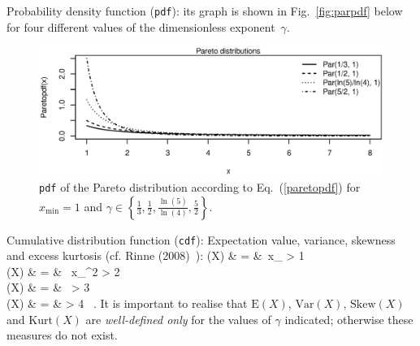 \medskip
\noindent
Probability density function (\texttt{pdf}):
%
\be
{}
\ee
%
%
its graph is shown in Fig.~\ref{fig:parpdf} below for four 
different values of the dimensionless exponent~$\gamma$.
%
\begin{figure}[!htb]
\begin{center}
\includegraphics[scale=0.8]{parpdf.eps}
\end{center}
\caption{\texttt{pdf} of the Pareto distribution according 
to Eq.~(\ref{paretopdf}) for $x_\mathrm{min}=1$ and $\displaystyle 
\gamma \in \left\{\frac{1}{3}, \frac{1}{2}, \frac{\ln(5)}{\ln(4)}, 
\frac{5}{2}\right\}$.}
\end{figure}
%

\medskip
\noindent
Cumulative distribution function (\texttt{cdf}):
%
\be
{}
\ee
%
Expectation value, variance, skewness and excess kurtosis (cf. 
Rinne (2008)~):
%
\bea
{}(X) & = & \,x_
\qquad{}\quad \gamma > 1 \\
%
(X) & = & \,
x_^{2}
\qquad{}\quad \gamma > 2 \\
%
(X) & = & 
\,
\qquad{}\quad \gamma > 3 \\
%
(X) & = & 
\qquad{}\quad \gamma > 4 \ .
\eea
%
It is important to realise that $\mathrm{E}(X)$, $\mathrm{Var}(X)$, 
$\mathrm{Skew}(X)$ and $\mathrm{Kurt}(X)$ are \textit{well-defined
only} for the values of $\gamma$ indicated; otherwise these
measures do not exist.

